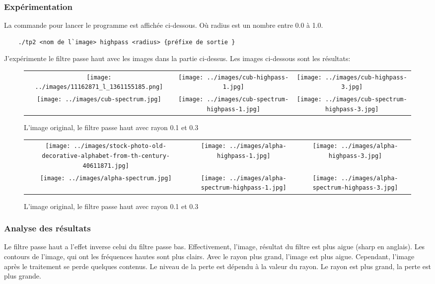 \documentclass[paper=a4, fontsize=11pt]{scrartcl}	%
\begin{document}
\subsubsection{Expérimentation}
La commande pour lancer le programme est affichée ci-dessous. Où radius est un nombre entre 0.0 à 1.0.
\begin{lstlisting}
	./tp2 <nom de l`image> highpass <radius> {préfixe de sortie }
\end{lstlisting}
J'expérimente le filtre passe haut avec les images dans la partie ci-dessus. Les images ci-dessous sont les résultats:
\begin{figure}[h]
	\begin{center}
		\begin{tabular}[h]{ccc}
		\texttt{[image: ../images/11162871\_l\_1361155185.png]}&
		\texttt{[image: ../images/cub-highpass-1.jpg]}&
		\texttt{[image: ../images/cub-highpass-3.jpg]}\\
		\texttt{[image: ../images/cub-spectrum.jpg]}&		
		\texttt{[image: ../images/cub-spectrum-highpass-1.jpg]}&
		\texttt{[image: ../images/cub-spectrum-highpass-3.jpg]}
		\end{tabular}

	\end{center}
	\caption{L'image original, le filtre passe haut avec rayon 0.1 et 0.3}	
\end{figure}
\newpage
\begin{figure}[h]
	\begin{center}
		\begin{tabular}[h]{ccc}
		\texttt{[image: ../images/stock-photo-old-decorative-alphabet-from-th-century-40611871.jpg]}&
		\texttt{[image: ../images/alpha-highpass-1.jpg]}&
		\texttt{[image: ../images/alpha-highpass-3.jpg]}\\
		\texttt{[image: ../images/alpha-spectrum.jpg]}&		
		\texttt{[image: ../images/alpha-spectrum-highpass-1.jpg]}&
		\texttt{[image: ../images/alpha-spectrum-highpass-3.jpg]}		\end{tabular}
	\end{center}
	\caption{L'image original, le filtre passe haut avec rayon 0.1 et 0.3}	
\end{figure}

\subsubsection{Analyse des résultats}
Le filtre passe haut a l'effet inverse celui du filtre passe bas. Effectivement, l'image, résultat du filtre est plus aigue (sharp en anglais). Les contours de l'image, qui ont les fréquences hautes sont plus clairs. Avec le rayon plus grand, l'image est plus aigue.
Cependant, l'image après le traitement se perde quelques contenus. Le niveau de la perte est dépendu à la valeur du rayon. Le rayon est plus grand, la perte est plus grande.  
\end{document}
